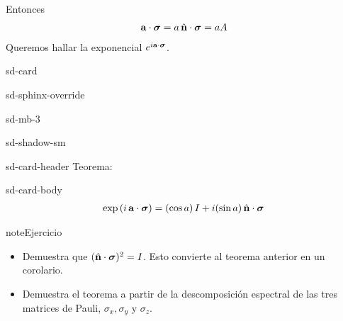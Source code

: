 \documentclass[letterpaper,10pt,english]{jupyterBook}
\begin{document}
\sphinxAtStartPar
Entonces
\begin{equation*}
\begin{split}
{\bf a} \cdot \boldsymbol{\sigma} =  a\, \hat{\bf n} \cdot \boldsymbol{\sigma} = a A
\end{split}
\end{equation*}
\sphinxAtStartPar
Queremos hallar la exponencial \(e^{i {\bf a} \cdot \boldsymbol{\sigma}}\).

\begin{sphinxuseclass}{sd-card}
\begin{sphinxuseclass}{sd-sphinx-override}
\begin{sphinxuseclass}{sd-mb-3}
\begin{sphinxuseclass}{sd-shadow-sm}
\begin{sphinxuseclass}{sd-card-header}
\sphinxAtStartPar
Teorema:

\end{sphinxuseclass}
\begin{sphinxuseclass}{sd-card-body}\begin{equation*}
\begin{split}
\exp \left( \rule{0mm}{4mm} i\,   {\bf a} \cdot \boldsymbol{\sigma}  \right) = (\cos a)\, I + i (\sin a)\,\hat{\bf n} \cdot  \boldsymbol{\sigma} \, 
\end{split}
\end{equation*}
\end{sphinxuseclass}
\end{sphinxuseclass}
\end{sphinxuseclass}
\end{sphinxuseclass}
\end{sphinxuseclass}
\begin{sphinxadmonition}{note}{Ejercicio}
\begin{itemize}
\item {} 
\sphinxAtStartPar
Demuestra  que \((\hat{\bf n} \cdot \boldsymbol{\sigma})^2 = I\). Esto convierte al teorema anterior en un corolario.

\item {} 
\sphinxAtStartPar
Demuestra el teorema  a partir de  la descomposición espectral de las tres matrices de Pauli, \(\sigma_x, \sigma_y \) y \(\sigma_z\).

\end{itemize}
\end{sphinxadmonition}
\end{document}
